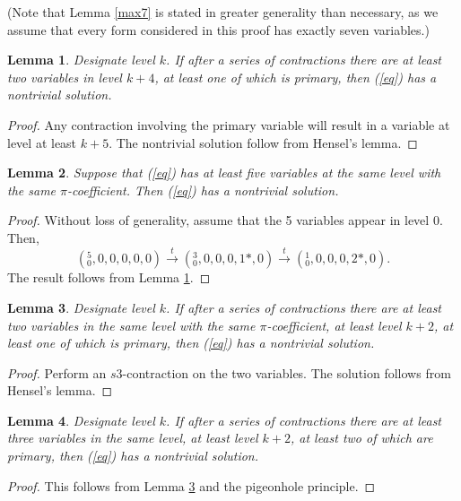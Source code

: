 \documentclass[draft]{publmathdeb}
\newtheorem{lemma}{Lemma}
\begin{document}
(Note that Lemma \ref{max7} is stated in greater generality than necessary, as we assume that every form considered in this proof has exactly seven variables.)

\begin{lemma}\label{donefrom4}
Designate level $k$.  If after a series of contractions there are at least two variables in level $k+4$, at least one of which is primary, then (\ref{eq}) has a nontrivial solution.
\end{lemma}
\begin{proof}
Any contraction involving the primary variable will result in a variable at level at least $k+5$.  The nontrivial solution follow from Hensel's lemma.
\end{proof}

\begin{lemma} \label{max5same}
Suppose that (\ref{eq}) has at least five variables at the same level with the same $\pi$-coefficient.  Then (\ref{eq}) has a nontrivial solution.
\end{lemma}
\begin{proof}
Without loss of generality, assume that the 5 variables appear in level 0.  Then,
$$(^{5}_{0},0,0,0,0,0) \xrightarrow{t}
(^{3}_{0},0,0,0,1*,0) \xrightarrow{t}
(^{1}_{0},0,0,0,2*,0).$$
The result follows from Lemma \ref{donefrom4}.
\end{proof}

\begin{lemma} \label{donefrom2}
Designate level $k$.  If after a series of contractions there are at least two variables in the same level with the same $\pi$-coefficient, at least level $k+2$, at least one of which is primary, then (\ref{eq}) has a nontrivial solution.
\end{lemma}
\begin{proof}
Perform an $s3$-contraction on the two variables.  The solution follows from Hensel's lemma.
\end{proof}

\begin{lemma} \label{donefrom2with3}
Designate level $k$.  If after a series of contractions there are at least three variables in the same level, at least level $k+2$, at least two of which are primary, then (\ref{eq}) has a nontrivial solution.
\end{lemma}
\begin{proof}
This follows from Lemma \ref{donefrom2} and the pigeonhole principle.
\end{proof}
\end{document}
